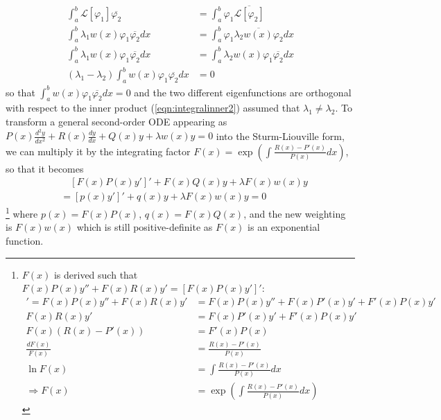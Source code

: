 \begin{align*}
\int_a^b \mathcal{L}[\varphi_1]\overline{\varphi_2} &= \int_a^b \varphi_1\overline{\mathcal{L}[\varphi_2]} \\
\int_a^b \lambda_1 w(x)\varphi_1\overline{\varphi_2} dx &= \int_a^b \varphi_1\overline{\lambda_2 w(x)\varphi_2} dx \\
\int_a^b \lambda_1 w(x)\varphi_1\overline{\varphi_2} dx &= \int_a^b \lambda_2 w(x)\varphi_1 \overline{\varphi_2} dx\\
(\lambda_1 - \lambda_2) \int_a^b w(x)\varphi_1 \overline{\varphi_2} dx &= 0
\end{align*}
so that $\int_a^b w(x)\varphi_1 \overline{\varphi_2} dx = 0$ and the two different eigenfunctions are orthogonal with respect to the inner product (\ref{eqn:integralinner2}) assumed that $\lambda_1 \neq \lambda_2$. To transform a general second-order ODE appearing as $P(x)\frac{d^2y}{dx^2} + R(x)\frac{dy}{dx} + Q(x)y + \lambda w(x)y = 0$ into the Sturm-Liouville form, we can multiply it by the integrating factor $F(x) = \exp(\int \frac{R(x) - P'(x)}{P(x)} dx)$, so that it becomes
\begin{align*}
&\quad [F(x)P(x)y']' + F(x)Q(x)y + \lambda F(x)w(x)y \\
&= [p(x)y']' + q(x)y + \lambda F(x)w(x)y = 0
\end{align*}
\footnote{$F(x)$ is derived such that $F(x)P(x)y'' + F(x)R(x)y' = [F(x)P(x)y']'$:
\begin{align*}
[F(x)P(x)y']' = F(x)P(x)y'' + F(x)R(x)y' &= F(x)P(x)y'' + F(x)P'(x)y' + F'(x)P(x)y' \\
F(x)R(x)y' &=  F(x)P'(x)y' + F'(x)P(x)y' \\
F(x)(R(x) - P'(x)) &= F'(x)P(x) \\
\frac{dF(x)}{F(x)} &= \frac{R(x) - P'(x)}{P(x)} \\
\ln F(x) &= \int \frac{R(x) - P'(x)}{P(x)} dx \\
\Rightarrow F(x) &= \exp(\int \frac{R(x) - P'(x)}{P(x)} dx)
\end{align*}}
where $p(x) = F(x)P(x)$, $q(x) = F(x)Q(x)$, and the new weighting is $F(x)w(x)$ which is still positive-definite as $F(x)$ is an exponential function.

